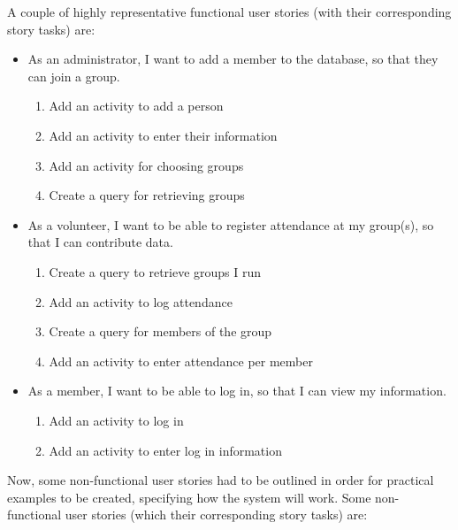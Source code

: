 \documentclass{l3proj}
\begin{document}
A couple of highly representative functional user stories (with their corresponding story tasks) are:
\begin{itemize}
\item As an administrator, I want to add a member to the database, so that they can join a group.

	\begin{enumerate}
	\item Add an activity to add a person
	\item Add an activity to enter their information
	\item Add an activity for choosing groups
	\item Create a query for retrieving groups
	\end{enumerate}

\item As a volunteer, I want to be able to register attendance at my group(s), so that I can contribute data.

	\begin{enumerate}
	\item Create a query to retrieve groups I run
	\item Add an activity to log attendance
	\item Create a query for members of the group
	\item Add an activity to enter attendance per member
	\end{enumerate}

\item As a member, I want to be able to log in, so that I can view my information.

	\begin{enumerate}
	\item Add an activity to log in
	\item Add an activity to enter log in information
	\end{enumerate}
\end{itemize}

Now, some non-functional user stories had to be outlined in order for practical examples to be created, specifying how the system will work. Some non-functional user stories (which their corresponding story tasks) are:
\end{document}
